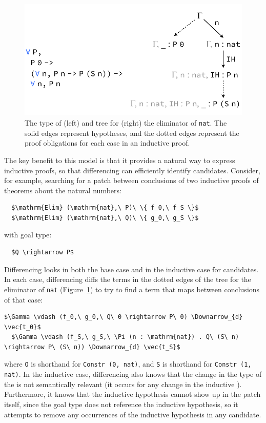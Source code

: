 \begin{figure}
\begin{center}
\includegraphics[scale=0.55]{repair/nat_ind}
\end{center}
\caption{The type of (left) and tree for (right) the eliminator of \lstinline{nat}. The solid edges represent hypotheses, and the dotted edges represent the proof obligations for each case in an inductive proof.} %
\label{fig:cattree}
\end{figure}

The key benefit to this model is that it provides a natural way to express inductive proofs, so
that differencing can efficiently identify candidates.
Consider, for example, searching for a patch between conclusions of two inductive proofs of theorems about the natural numbers:

\begin{lstlisting}
  $\mathrm{Elim} (\mathrm{nat},\ P)\ \{ f_0,\ f_S \}$
  $\mathrm{Elim} (\mathrm{nat},\ Q)\ \{ g_0,\ g_S \}$ 
\end{lstlisting}
with goal type:

\begin{lstlisting}
  $Q \rightarrow P$
\end{lstlisting}

Differencing looks in both the base case and in the inductive case for candidates.
In each case, differencing diffs the terms in the dotted edges of the tree for the eliminator of \lstinline{nat} (Figure~\ref{fig:cattree}) to
try to find a term that maps between conclusions of that case:

\begin{lstlisting}[language=coq]
  $\Gamma \vdash (f_0,\ g_0,\ Q\ 0 \rightarrow P\ 0) \Downarrow_{d} \vec{t_0}$
  $\Gamma \vdash (f_S,\ g_S,\ \Pi (n : \mathrm{nat}) . Q\ (S\ n) \rightarrow P\ (S\ n)) \Downarrow_{d} \vec{t_S}$
\end{lstlisting}
where \lstinline{O} is shorthand for \lstinline{Constr (0, nat)}, and \lstinline{S} is shorthand for \lstinline{Constr (1, nat)}.
In the inductive case, differencing also knows that the change in the type of the  is not semantically relevant (it occurs for any change in the inductive ).
Furthermore, it knows that the inductive hypothesis cannot show up in the patch itself, since the goal type does not reference the inductive hypothesis,
so it attempts to remove any occurrences of the inductive hypothesis in any candidate.

